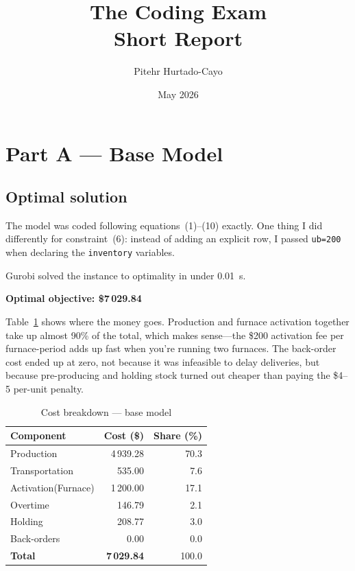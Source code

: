 \documentclass[11pt,a4paper]{article}
\title{\textbf{The Coding Exam}\\[4pt]
\large Short Report\\}
\author{Pitehr Hurtado-Cayo}
\date{May 2026}
\begin{document}
\maketitle

\section{Part A --- Base Model}

\subsection{Optimal solution}

The model was coded following equations~(1)--(10) exactly. One thing I did
differently for constraint~(6): instead of adding an explicit row, I passed
\texttt{ub=200} when declaring the \texttt{inventory} variables.

Gurobi solved the instance to optimality in under 0.01~s.

\medskip
\noindent\textbf{Optimal objective: \$7\,029.84}
\medskip

Table~\ref{tab:cost} shows where the money goes. Production and furnace
activation together take up almost 90\% of the total, which makes sense---the
\$200 activation fee per furnace-period adds up fast when you're running two
furnaces. The back-order cost ended up at zero, not because it was infeasible
to delay deliveries, but because pre-producing and holding stock turned out
cheaper than paying the \$4--5 per-unit penalty.

\begin{table}[H]
  \centering
  \caption{Cost breakdown --- base model}
  \label{tab:cost}
  \begin{tabular}{lrr}
    \toprule
    Component           & Cost (\$)          & Share (\%) \\
    \midrule
    Production          & 4\,939.28          & 70.3       \\
    Transportation      & 535.00             & 7.6        \\
    Activation(Furnace) & 1\,200.00          & 17.1       \\
    Overtime            & 146.79             & 2.1        \\
    Holding             & 208.77             & 3.0        \\
    Back-orders         & 0.00               & 0.0        \\
    \midrule
    \textbf{Total}      & \textbf{7\,029.84} & 100.0      \\
    \bottomrule
  \end{tabular}
\end{table}
\end{document}
